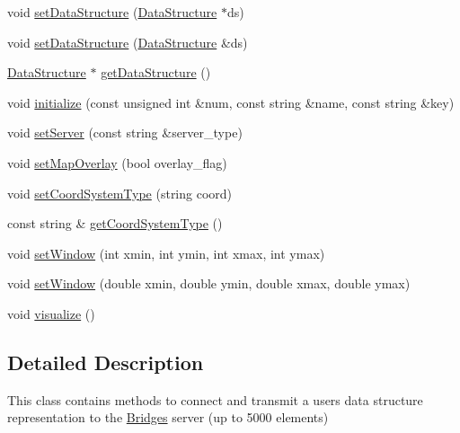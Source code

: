 \begin{DoxyCompactItemize}
void \mbox{\hyperlink{classbridges_1_1_bridges_a7447e2d5808c492d26132690c1a639a7}{set\+Data\+Structure}} (\mbox{\hyperlink{classbridges_1_1_data_structure}{Data\+Structure}} $\ast$ds)
\item 
void \mbox{\hyperlink{classbridges_1_1_bridges_a40c30470565f76310b5a8aea80dcab3c}{set\+Data\+Structure}} (\mbox{\hyperlink{classbridges_1_1_data_structure}{Data\+Structure}} \&ds)
\item 
\mbox{\hyperlink{classbridges_1_1_data_structure}{Data\+Structure}} $\ast$ \mbox{\hyperlink{classbridges_1_1_bridges_a5ddfb17c2fb2d3ca89e7564677251dea}{get\+Data\+Structure}} ()
\item 
void \mbox{\hyperlink{classbridges_1_1_bridges_a10272250ed6f4bb8281dcaecc61fa698}{initialize}} (const unsigned int \&num, const string \&name, const string \&key)
\item 
void \mbox{\hyperlink{classbridges_1_1_bridges_afa05302cf91c91b902aef693525107a5}{set\+Server}} (const string \&server\+\_\+type)
\item 
void \mbox{\hyperlink{classbridges_1_1_bridges_a221442c674b625a403486076cf8a7c03}{set\+Map\+Overlay}} (bool overlay\+\_\+flag)
\item 
void \mbox{\hyperlink{classbridges_1_1_bridges_ad00c07d3a028110424909081a94c4013}{set\+Coord\+System\+Type}} (string coord)
\item 
const string \& \mbox{\hyperlink{classbridges_1_1_bridges_aac3cdb607177ff537f5160c3790d814a}{get\+Coord\+System\+Type}} ()
\item 
void \mbox{\hyperlink{classbridges_1_1_bridges_a4e4817085ea8147039a2be72792b6a6e}{set\+Window}} (int xmin, int ymin, int xmax, int ymax)
\item 
void \mbox{\hyperlink{classbridges_1_1_bridges_a2e8fd393ec46a2f80e9f8d8cc4cb0aa6}{set\+Window}} (double xmin, double ymin, double xmax, double ymax)
\item 
void \mbox{\hyperlink{classbridges_1_1_bridges_a2806e395134614cdd6327400b53d28ad}{visualize}} ()
\end{DoxyCompactItemize}


\subsection{Detailed Description}
This class contains methods to connect and transmit a user\textquotesingle{}s data structure representation to the \mbox{\hyperlink{classbridges_1_1_bridges}{Bridges}} server (up to 5000 elements) 

